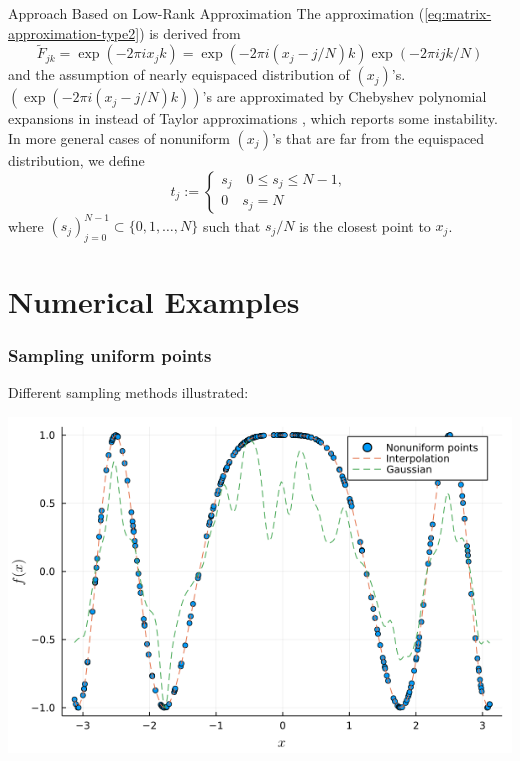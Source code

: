 \documentclass{beamer}
\begin{document}
\begin{frame}{Approach Based on Low-Rank Approximation}
  The approximation (\ref{eq:matrix-approximation-type2}) is derived from
  \begin{equation}
      \tilde{F}_{jk} = \exp(-2\pi i x_j k)
    = \exp(-2\pi i (x_j - j/N)k)\exp(-2\pi i jk/N)
  \end{equation}
  and the assumption of nearly equispaced distribution of $(x_j)$'s.
  $(\exp(-2\pi i (x_j - j/N)k))$'s are approximated by Chebyshev polynomial expansions
  in \cite{SISC-2018-Townsend} instead of Taylor approximations \cite{SISC-1996-Anderson},
  which reports some instability.
  In more general cases of nonuniform $(x_j)$'s that are far from the equispaced distribution,
  we define
  \begin{equation}
    t_{j} :=
    \begin{cases}
      s_{j} \quad 0 \le s_{j} \le N-1, \\
      0     \quad s_{j} = N
    \end{cases}
  \end{equation}
  where $(s_{j})_{j=0}^{N-1} \subset \{0, 1, \dots, N\}$ such that
  $s_{j}/N$ is the closest point to $x_{j}$.
\end{frame}

\section{Numerical Examples}

\begin{frame}
    \sectionpage
\end{frame}

\begin{frame}
  \frametitle{Sampling uniform points}
  Different sampling methods illustrated:

  \vfill

  \centering \includegraphics[width=.8\textwidth]{images/conv_vs_interp.png}
\end{frame}
\end{document}
